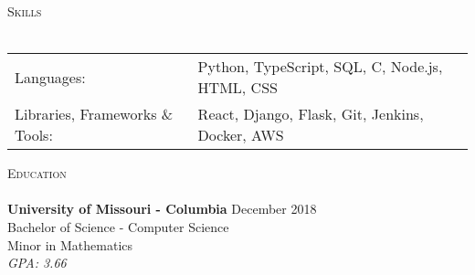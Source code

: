 \documentclass[a4paper]{article}
\newcommand{\lineunder} {
    \vspace*{-8pt} \\
    \hspace*{-18pt} \hrulefill \\
}
\newcommand{\header} [1] {
    {\hspace*{-18pt}\vspace*{6pt} \textsc{#1}}
    \vspace*{-6pt} \lineunder
}
\begin{document}
\header{Skills}
\vspace{1mm}
\begin{tabular}{ l l }
	Languages:               & Python, TypeScript, SQL, C, Node.js, HTML, CSS \\
	Libraries, Frameworks \& Tools: & React, Django, Flask, Git, Jenkins, Docker, AWS \\
\end{tabular}
\vspace{2mm}

\header{Education}
\textbf{University of Missouri - Columbia} \hfill December 2018 \\
Bachelor of Science - Computer Science \hfill \\
Minor in Mathematics\\
\textit{GPA: 3.66}\\
 
\vspace{2mm}



\ 
\end{document}
